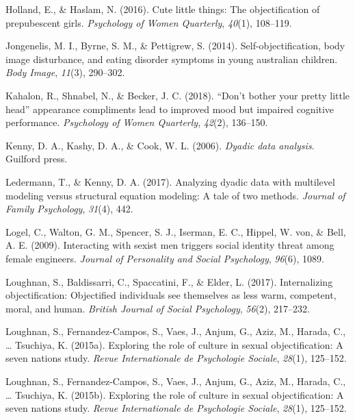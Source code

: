 \documentclass[man]{apa6}
\begin{document}
\hypertarget{ref-holland2016}{}
Holland, E., \& Haslam, N. (2016). Cute little things: The
objectification of prepubescent girls. \emph{Psychology of Women
Quarterly}, \emph{40}(1), 108--119.

\hypertarget{ref-jongenelis2014}{}
Jongenelis, M. I., Byrne, S. M., \& Pettigrew, S. (2014).
Self-objectification, body image disturbance, and eating disorder
symptoms in young australian children. \emph{Body Image}, \emph{11}(3),
290--302.

\hypertarget{ref-kahalon2018don}{}
Kahalon, R., Shnabel, N., \& Becker, J. C. (2018). ``Don't bother your
pretty little head'' appearance compliments lead to improved mood but
impaired cognitive performance. \emph{Psychology of Women Quarterly},
\emph{42}(2), 136--150.

\hypertarget{ref-kenny2006dyadic}{}
Kenny, D. A., Kashy, D. A., \& Cook, W. L. (2006). \emph{Dyadic data
analysis}. Guilford press.

\hypertarget{ref-ledermann2017analyzing}{}
Ledermann, T., \& Kenny, D. A. (2017). Analyzing dyadic data with
multilevel modeling versus structural equation modeling: A tale of two
methods. \emph{Journal of Family Psychology}, \emph{31}(4), 442.

\hypertarget{ref-logel2009interacting}{}
Logel, C., Walton, G. M., Spencer, S. J., Iserman, E. C., Hippel, W.
von, \& Bell, A. E. (2009). Interacting with sexist men triggers social
identity threat among female engineers. \emph{Journal of Personality and
Social Psychology}, \emph{96}(6), 1089.

\hypertarget{ref-loughnan2017internalizing}{}
Loughnan, S., Baldissarri, C., Spaccatini, F., \& Elder, L. (2017).
Internalizing objectification: Objectified individuals see themselves as
less warm, competent, moral, and human. \emph{British Journal of Social
Psychology}, \emph{56}(2), 217--232.

\hypertarget{ref-loughnan2015exploring}{}
Loughnan, S., Fernandez-Campos, S., Vaes, J., Anjum, G., Aziz, M.,
Harada, C., \ldots{} Tsuchiya, K. (2015a). Exploring the role of culture
in sexual objectification: A seven nations study. \emph{Revue
Internationale de Psychologie Sociale}, \emph{28}(1), 125--152.

\hypertarget{ref-loughnan2015}{}
Loughnan, S., Fernandez-Campos, S., Vaes, J., Anjum, G., Aziz, M.,
Harada, C., \ldots{} Tsuchiya, K. (2015b). Exploring the role of culture
in sexual objectification: A seven nations study. \emph{Revue
Internationale de Psychologie Sociale}, \emph{28}(1), 125--152.
\end{document}
